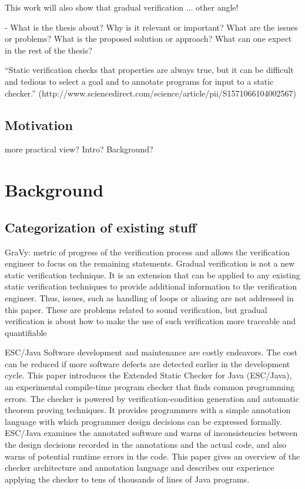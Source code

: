 This work will also show that gradual verification ... other angle!

- 
What is the thesis about?
Why is it relevant or important?
What are the issues or problems?
What is the proposed solution or approach?
What can one expect in the rest of the thesis?

“Static verification checks that properties are always true, but it can be difficult and tedious to select a goal and to annotate programs for input to a static checker.” (http://www.sciencedirect.com/science/article/pii/S1571066104002567)


\section{Motivation}
more practical view? Intro? Background?



\chapter{Background}

\section{Categorization of existing stuff}
\cite{arlt2014gradual}
GraVy:
metric of progress of the verification process
and allows the verification engineer to focus on the remaining statements.
Gradual verification is not a new static verification technique. It is an extension
that can be applied to any existing static verification techniques to provide
additional information to the verification engineer. Thus, issues, such as handling
of loops or aliasing are not addressed in this paper. These are problems
related to sound verification, but gradual verification is about how to make the
use of such verification more traceable and quantifiable

\cite{nelson2004extended} ESC/Java
Software development and maintenance are costly endeavors.
The cost can be reduced if more software defects are
detected earlier in the development cycle. This paper introduces
the Extended Static Checker for Java (ESC/Java),
an experimental compile-time program checker that finds
common programming errors. The checker is powered by
verification-condition generation and automatic theorem proving
techniques. It provides programmers with a simple
annotation language with which programmer design decisions
can be expressed formally. ESC/Java examines the
annotated software and warns of inconsistencies between the
design decisions recorded in the annotations and the actual
code, and also warns of potential runtime errors in the code.
This paper gives an overview of the checker architecture and
annotation language and describes our experience applying
the checker to tens of thousands of lines of Java programs.

